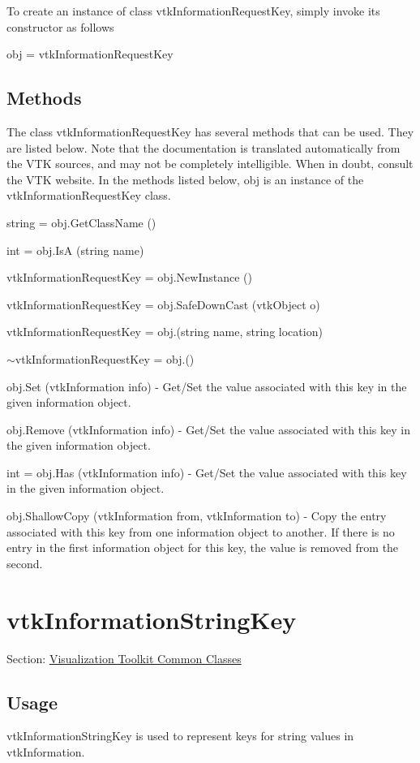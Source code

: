 To create an instance of class vtk\-Information\-Request\-Key, simply invoke its constructor as follows \begin{DoxyVerb}  obj = vtkInformationRequestKey
\end{DoxyVerb}
 \hypertarget{vtkwidgets_vtkxyplotwidget_Methods}{}\subsection{Methods}\label{vtkwidgets_vtkxyplotwidget_Methods}
The class vtk\-Information\-Request\-Key has several methods that can be used. They are listed below. Note that the documentation is translated automatically from the V\-T\-K sources, and may not be completely intelligible. When in doubt, consult the V\-T\-K website. In the methods listed below, {\ttfamily obj} is an instance of the vtk\-Information\-Request\-Key class. 
\begin{DoxyItemize}
\item {\ttfamily string = obj.\-Get\-Class\-Name ()}  
\item {\ttfamily int = obj.\-Is\-A (string name)}  
\item {\ttfamily vtk\-Information\-Request\-Key = obj.\-New\-Instance ()}  
\item {\ttfamily vtk\-Information\-Request\-Key = obj.\-Safe\-Down\-Cast (vtk\-Object o)}  
\item {\ttfamily vtk\-Information\-Request\-Key = obj.(string name, string location)}  
\item {\ttfamily $\sim$vtk\-Information\-Request\-Key = obj.()}  
\item {\ttfamily obj.\-Set (vtk\-Information info)} -\/ Get/\-Set the value associated with this key in the given information object.  
\item {\ttfamily obj.\-Remove (vtk\-Information info)} -\/ Get/\-Set the value associated with this key in the given information object.  
\item {\ttfamily int = obj.\-Has (vtk\-Information info)} -\/ Get/\-Set the value associated with this key in the given information object.  
\item {\ttfamily obj.\-Shallow\-Copy (vtk\-Information from, vtk\-Information to)} -\/ Copy the entry associated with this key from one information object to another. If there is no entry in the first information object for this key, the value is removed from the second.  
\end{DoxyItemize}\hypertarget{vtkcommon_vtkinformationstringkey}{}\section{vtk\-Information\-String\-Key}\label{vtkcommon_vtkinformationstringkey}
Section\-: \hyperlink{sec_vtkcommon}{Visualization Toolkit Common Classes} \hypertarget{vtkwidgets_vtkxyplotwidget_Usage}{}\subsection{Usage}\label{vtkwidgets_vtkxyplotwidget_Usage}
vtk\-Information\-String\-Key is used to represent keys for string values in vtk\-Information.

